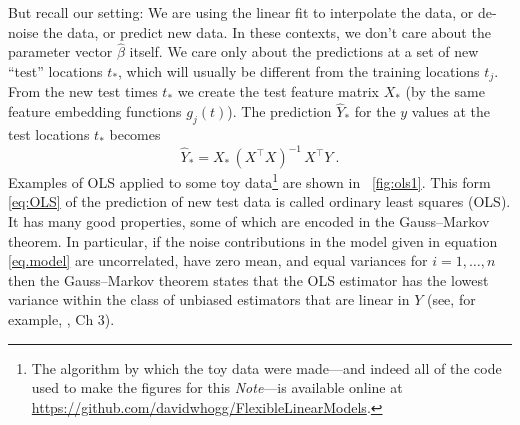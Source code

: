 \documentclass[12pt,letterpaper]{article}
\newcommand{\documentname}{\textsl{Note}}
\begin{document}
But recall our setting:
We are using the linear fit to interpolate the data, or de-noise the data, or predict new data.
In these contexts, we don't care about the parameter vector $\hat{\beta}$ itself.
We care only about the predictions at a set of new ``test'' locations $t_\ast$, which will usually be different from the training locations $t_j$.
From the new test times $t_\ast$ we create the test feature matrix $X_\ast$ (by the same feature embedding functions $g_j(t)$).
The prediction $\hat{Y}_\ast$ for the $y$ values at the test locations $t_\ast$ becomes
\begin{equation}\label{eq:OLS}
    \hat{Y}_\ast = X_\ast\,(X^\top X)^{-1}\,X^\top Y
    ~.
\end{equation}
Examples of OLS applied to some toy data\footnote{The algorithm by which the toy data were made---and indeed all of the code used to make the figures for this \documentname---is available online at \url{https://github.com/davidwhogg/FlexibleLinearModels}.} are shown in \figurename~\ref{fig:ols1}.
This form \eqref{eq:OLS} of the prediction of new test data is called ordinary least squares (OLS). It has many good properties, some of which are encoded in the Gauss--Markov theorem.
In particular, if the noise contributions in the model given in equation \eqref{eq.model} are uncorrelated, have zero mean, and equal variances for $i=1,\ldots, n$ then the Gauss--Markov theorem states that the OLS estimator has the lowest variance within the class of unbiased estimators that are linear in $Y$ (see, for example, \citealt{esl}, Ch 3).
\end{document}
